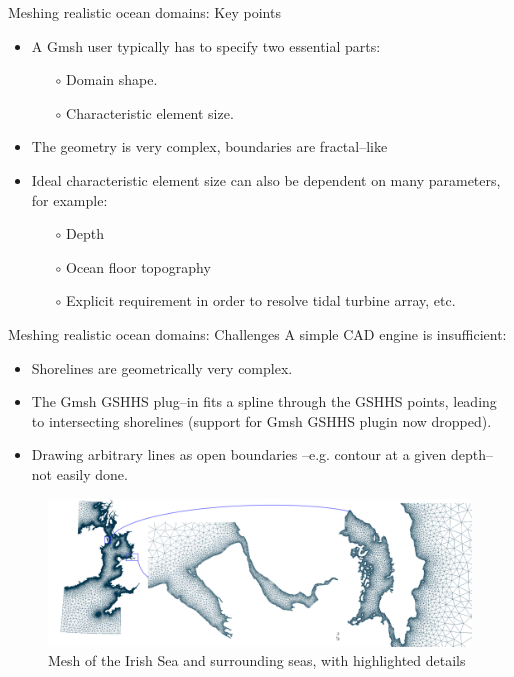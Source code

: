 \documentclass[t]{beamer}
\begin{document}
\begin{frame}{Meshing realistic ocean domains: Key points}
\begin{itemize}
   \item A Gmsh user typically has to specify two essential parts:
   \begin{itemize}
      \item[$\circ$] Domain shape.
      \item[$\circ$] Characteristic element size.
   \end{itemize}\vspace{20pt}
   \item The geometry is very complex, boundaries are fractal--like
   \item Ideal characteristic element size can also be dependent on many parameters, for example:
   \begin{itemize}
       \item[$\circ$] Depth
       \item[$\circ$] Ocean floor topography
       \item[$\circ$] Explicit requirement in order to resolve tidal turbine array, etc.
   \end{itemize}
\end{itemize}
\end{frame}

\begin{frame}{Meshing realistic ocean domains: Challenges}
A simple CAD engine is insufficient:
\begin{itemize}
   \item Shorelines are geometrically very complex.
   \item The Gmsh GSHHS plug--in fits a spline through the GSHHS points, leading to intersecting shorelines (support for Gmsh GSHHS plugin now dropped).
   \item Drawing arbitrary lines as open boundaries --e.g. contour at a given depth-- not easily done.
\end{itemize}
\begin{figure}[htbp]
 \centering
  \includegraphics[width=1.00\textwidth]{../figures/UKwc_mesh_with_details/UK_west_coast_with_details}
  \caption{Mesh of the Irish Sea and surrounding seas, with highlighted details}
  \label{fig:IrishSeaMesh}
\end{figure}
\end{frame}
\end{document}
